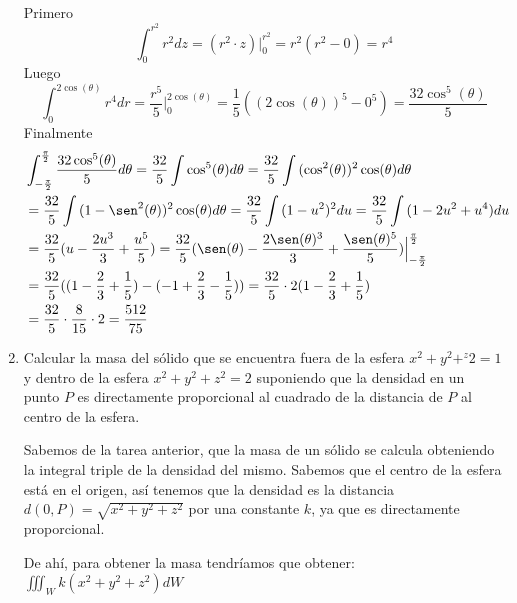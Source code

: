 \documentclass{article}
\begin{document}
\begin{enumerate}
{            Primero
            \[
                \int_{0}^{r^2}{r^2dz} = (r^2 \cdot z) \Big |_0^{r^2}
                = r^2 (r^2 - 0) = r^4
            \]
            Luego
            \[
                \int_{0}^{2\cos(\theta)}{r^4dr}
                = \frac{r^5}{5} \Big |_{0}^{2\cos(\theta)}
                = \frac{1}{5} ((2\cos(\theta))^5 - 0^5)
                = \frac{32\cos^5(\theta)}{5}
            \]
            Finalmente
            \begin{align*}
                &\int_{-\frac{\pi}{2}}^{\frac{\pi}{2}}{\frac{32\cos^5(\theta)}{5}d\theta}
                = \frac{32}{5} \int{\cos^5(\theta)d\theta}
                = \frac{32}{5} \int{(\cos^2(\theta))^2\cos(\theta)d\theta}\\
                &= \frac{32}{5} \int{(1-\sen^2(\theta))^2\cos(\theta)d\theta}
                = \frac{32}{5} \int{(1-u^2)^2du}
                = \frac{32}{5} \int{(1-2u^2+u^4)du}\\
                &= \frac{32}{5} (u - \frac{2u^3}{3} + \frac{u^5}{5})
                = \frac{32}{5} (\sen(\theta) - \frac{2\sen(\theta)^3}{3}
                + \frac{\sen(\theta)^5}{5}) \Big |_{-\frac{\pi}{2}}^{\frac{\pi}{2}}\\
                &= \frac{32}{5} ((1-\frac{2}{3}+\frac{1}{5})-(-1+\frac{2}{3}-\frac{1}{5}))
                = \frac{32}{5} \cdot 2(1-\frac{2}{3}+\frac{1}{5})\\
                &= \frac{32}{5} \cdot \frac{8}{15} \cdot 2 = \frac{512}{75}
            \end{align*}
	    }

        \item {
            Calcular la masa del sólido que se encuentra fuera de la esfera
            $x^2+y^2+^z2=1$ y dentro de la esfera $x^2+y^2+z^2=2$ suponiendo
            que la densidad en un punto $P$ es directamente proporcional al
            cuadrado de la distancia de $P$ al centro de la esfera.

            \color{azul}
            
            Sabemos de la tarea anterior, que la masa de un sólido se calcula obteniendo la integral triple de la densidad del mismo. Sabemos que el centro de la esfera está en el origen, así tenemos que la densidad es la distancia $d(0,P) = \sqrt{x^2+y^2+z^2}$ por una constante $k$, ya que es directamente proporcional.
            
            De ahí, para obtener la masa tendríamos que obtener: 
            $\iiint_{W}k(x^2+y^2+z^2)dW$
            
}
\end{enumerate}
\end{document}
